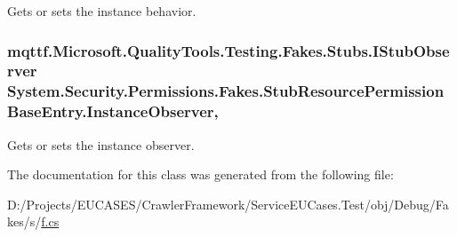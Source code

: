 Gets or sets the instance behavior.

\hypertarget{class_system_1_1_security_1_1_permissions_1_1_fakes_1_1_stub_resource_permission_base_entry_a97753114d577f80c13fbcc74027b2305}{
\subsubsection[{Instance\-Observer}]{\setlength{\rightskip}{0pt plus 5cm}mqttf.\-Microsoft.\-Quality\-Tools.\-Testing.\-Fakes.\-Stubs.\-I\-Stub\-Observer System.\-Security.\-Permissions.\-Fakes.\-Stub\-Resource\-Permission\-Base\-Entry.\-Instance\-Observer\hspace{0.3cm}{\ttfamily [get]}, {\ttfamily [set]}}}\label{class_system_1_1_security_1_1_permissions_1_1_fakes_1_1_stub_resource_permission_base_entry_a97753114d577f80c13fbcc74027b2305}


Gets or sets the instance observer.



The documentation for this class was generated from the following file\-:\begin{DoxyCompactItemize}
\item 
D\-:/\-Projects/\-E\-U\-C\-A\-S\-E\-S/\-Crawler\-Framework/\-Service\-E\-U\-Cases.\-Test/obj/\-Debug/\-Fakes/s/\hyperlink{s_2f_8cs}{f.\-cs}\end{DoxyCompactItemize}

